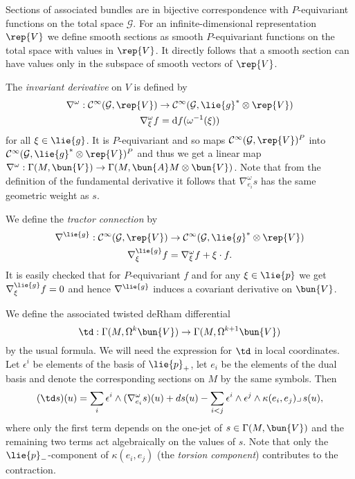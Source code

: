 Sections of associated bundles are in bijective correspondence with $P$-equi\-variant functions on the total space $\mathcal{G}$. For an infinite-dimensional representation $\rep{V}$ we define smooth sections as smooth $P$-equivariant functions on the total space with values in $\rep{V}$. It directly follows that a smooth section can have values only in the subspace of smooth vectors of $\rep{V}$.

 The \emph{invariant derivative} on $V$ is defined by
\begin{gather*}
  \nabla^\omega: \mathcal{C}^\infty(\mathcal{G},\rep{V}) \to \mathcal{C}^\infty(\mathcal{G},\lie{g}^*\otimes\rep{V})\\
  \nabla^\omega_\xi f = \mathrm{d}f(\omega^{-1}(\xi))
\end{gather*}
for all $\xi \in \lie{g}$. It is $P$-equivariant and so maps $\mathcal{C}^\infty(\mathcal{G},\rep{V})^P$ into $\mathcal{C}^\infty(\mathcal{G},\lie{g}^*\otimes \rep{V})^P$ and thus we get a linear map $\nabla^\omega: \Gamma(M,\bun{V}) \to \Gamma(M,\bun{A}M\otimes \bun{V})$. Note that from the definition of the fundamental derivative it follows that $\nabla^\omega_{e_i} s$ has the same geometric weight as $s$.

 We define the \emph{tractor connection} by
\begin{gather*}
 \nabla^\lie{g}: \mathcal{C}^\infty(\mathcal{G},\rep{V}) \to \mathcal{C}^\infty(\mathcal{G},\lie{g}^*\otimes\rep{V})\\
 \nabla^\lie{g}_\xi f = \nabla^\omega_\xi f + \xi \cdot f.
\end{gather*}
 It is easily checked that for $P$-equivariant $f$ and for any $\xi \in \lie{p}$ we get $\nabla^\lie{g}_\xi f = 0$ and hence $\nabla^\lie{g}$ induces a covariant derivative on $\bun{V}$.

We define the associated twisted deRham differential
\[
 \td: \Gamma(M,\Omega^k\bun{V}) \to \Gamma(M,\Omega^{k+1}\bun{V})
\]
by the usual formula. We will need the expression for $\td$ in local coordinates. Let $\epsilon^i$ be elements of the basis of $\lie{p}_+$, let $e_i$ be the elements of the dual basis and denote the corresponding sections on $M$ by the same symbols. Then
\[
 (\td s) (u)=  \sum_i \epsilon^i\wedge (\nabla^\omega_{e_i} s)(u) + d s(u) - \sum_{i <j} \epsilon^i\wedge\epsilon^j\wedge\kappa(e_i,e_j)  \lrcorner\, s(u),
\]
where only the first term depends on the one-jet of $s\in\Gamma(M,\bun{V})$ and the remaining two terms act algebraically on the values of $s$. Note that only the $\lie{p}_-$-component of $\kappa(e_i,e_j)$ (the \emph{torsion component}) contributes to the contraction. %

